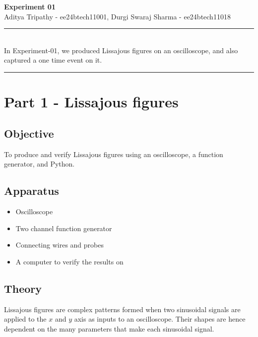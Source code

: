 \documentclass[a4paper,12pt]{article}
\renewenvironment{abstract}
 {\par\noindent\textbf{\abstractname}\ \ignorespaces \\}
 {\par\noindent\medskip}
\begin{document}
\pagestyle{fancy}
\thispagestyle{empty}
\fancyhead[L]{}
\renewcommand*{\thefootnote}{\fnsymbol{footnote}}
\begin{center}
\Large{\textbf{Experiment 01}}
\vspace{0.4cm}
\normalsize
\\ Aditya Tripathy - ee24btech11001, Durgi Swaraj Sharma - ee24btech11018\\
\medskip
\normalsize
\end{center}
{\color{gray}\hrule}
\vspace{0.4cm}
\begin{abstract}
In Experiment-01, we produced Lissajous figures on an oscilloscope, and also captured a one time event on it.
\end{abstract}
{\color{gray}\hrule}
\medskip
\section{Part 1 - Lissajous figures}
\subsection{Objective}
To produce and verify Lissajous figures using an oscilloscope, a function generator, and Python.
\subsection{Apparatus}
\begin{itemize}
\item Oscilloscope
\item Two channel function generator
\item Connecting wires and probes
\item A computer to verify the results on
\end{itemize}
\subsection{Theory}
Lissajous figures are complex patterns formed when two sinusoidal signals are applied to the $x$ and $y$ axis as inputs to an oscilloscope.
Their shapes are hence dependent on the many parameters that make each sinusoidal signal.
\end{document}
